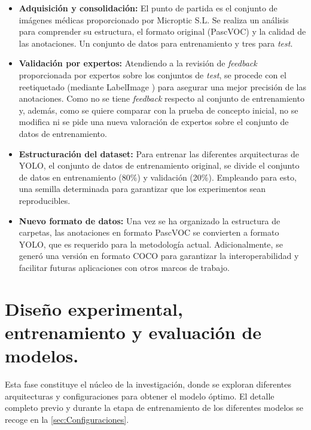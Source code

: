 \documentclass[12pt,a4paper,onecolumn,oneside]{report}
\begin{document}
\begin{itemize}
  \item \textbf{Adquisición y consolidación:} El punto de partida es el conjunto de imágenes médicas proporcionado por Microptic S.L. \cite{microptic} 
  Se realiza un análisis para comprender su estructura, el formato original (PascVOC) y la calidad de las anotaciones. Un conjunto de datos para entrenamiento y tres para \textit{test}.
  \item \textbf{Validación por expertos:} Atendiendo a la revisión de \textit{feedback} proporcionada por expertos sobre los conjuntos de \textit{test}, se procede con el reetiquetado (mediante LabelImage \cite{labelimg_github}) para asegurar una mejor precisión de las anotaciones. 
  Como no se tiene \textit{feedback} respecto al conjunto de entrenamiento y, además, como se quiere comparar con la prueba de concepto inicial, no se modifica ni se pide una nueva valoración de expertos sobre el conjunto de datos de entrenamiento.
  \item \textbf{Estructuración del dataset:} Para entrenar las diferentes arquitecturas de YOLO, el conjunto de datos de entrenamiento original, se divide el conjunto de datos en entrenamiento (80\%) y validación (20\%). Empleando para esto, una semilla determinada para garantizar que los experimentos sean reproducibles. 
  \item \textbf{Nuevo formato de datos:} Una vez se ha organizado la estructura de carpetas, las anotaciones en formato PascVOC se convierten a formato YOLO, que es requerido para la metodología actual. Adicionalmente, se generó una versión en formato COCO para garantizar la interoperabilidad y facilitar futuras aplicaciones con otros marcos de trabajo.
\end{itemize}

\section{Diseño experimental, entrenamiento y evaluación de modelos.}
\label{Entrenamiento, validación y evaluación de modelos YOLO}

Esta fase constituye el núcleo de la investigación, donde se exploran diferentes arquitecturas y configuraciones para obtener el modelo óptimo.
El detalle completo previo y durante la etapa de entrenamiento de los diferentes modelos se recoge en la \autoref{sec:Configuraciones}.
\end{document}
